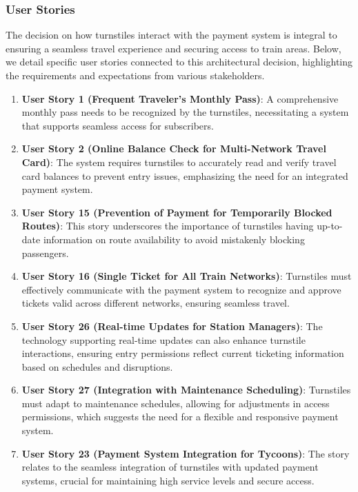 \subsubsection*{User Stories}
The decision on how turnstiles interact with the payment system is integral to ensuring a seamless travel experience and securing access to train areas. Below, we detail specific user stories connected to this architectural decision, highlighting the requirements and expectations from various stakeholders.

\begin{enumerate}[noitemsep]
    \item \textbf{User Story 1 (Frequent Traveler's Monthly Pass)}: A comprehensive monthly pass needs to be recognized by the turnstiles, necessitating a system that supports seamless access for subscribers.
    
    \item \textbf{User Story 2 (Online Balance Check for Multi-Network Travel Card)}: The system requires turnstiles to accurately read and verify travel card balances to prevent entry issues, emphasizing the need for an integrated payment system.
    
    \item \textbf{User Story 15 (Prevention of Payment for Temporarily Blocked Routes)}: This story underscores the importance of turnstiles having up-to-date information on route availability to avoid mistakenly blocking passengers.
    
    \item \textbf{User Story 16 (Single Ticket for All Train Networks)}: Turnstiles must effectively communicate with the payment system to recognize and approve tickets valid across different networks, ensuring seamless travel.
    
    \item \textbf{User Story 26 (Real-time Updates for Station Managers)}: The technology supporting real-time updates can also enhance turnstile interactions, ensuring entry permissions reflect current ticketing information based on schedules and disruptions.
    
    \item \textbf{User Story 27 (Integration with Maintenance Scheduling)}: Turnstiles must adapt to maintenance schedules, allowing for adjustments in access permissions, which suggests the need for a flexible and responsive payment system.
    
    \item \textbf{User Story 23 (Payment System Integration for Tycoons)}: The story relates to the seamless integration of turnstiles with updated payment systems, crucial for maintaining high service levels and secure access.
\end{enumerate}

